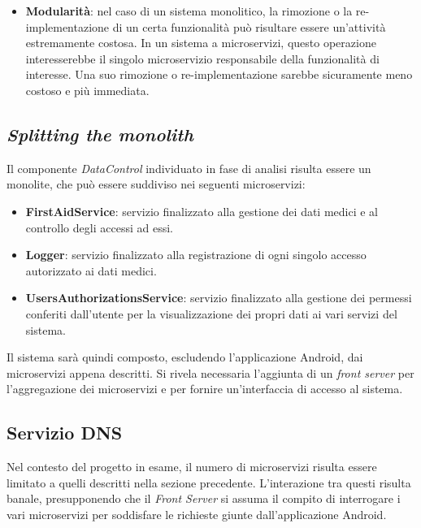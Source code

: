 \documentclass[a4paper,12pt]{report}
\begin{document}
\begin{itemize}
	\item \textbf{Modularità}: nel caso di un sistema monolitico, la rimozione o la re-implementazione di un certa funzionalità può risultare essere un'attività estremamente costosa. In un sistema a microservizi, questo operazione interesserebbe il singolo microservizio responsabile della funzionalità di interesse. Una suo rimozione o re-implementazione sarebbe sicuramente meno costoso e più immediata.
\end{itemize}


\subsection{\emph{Splitting the monolith}} \label{splitting}

Il componente \emph{DataControl} individuato in fase di analisi risulta essere un monolite, che può essere suddiviso nei seguenti microservizi:

\begin{itemize}
	\item \textbf{FirstAidService}: servizio finalizzato alla gestione dei dati medici e al controllo degli accessi ad essi. 
	\item \textbf{Logger}: servizio finalizzato alla registrazione di ogni singolo accesso autorizzato ai dati medici.
	\item \textbf{UsersAuthorizationsService}: servizio finalizzato alla gestione dei permessi conferiti dall'utente per la visualizzazione dei propri dati ai vari servizi del sistema. 
\end{itemize}

Il sistema sarà quindi composto, escludendo l'applicazione Android, dai microservizi appena descritti. Si rivela necessaria l'aggiunta di un \emph{front server} per l'aggregazione dei microservizi e per fornire un'interfaccia di accesso al sistema.

\subsection{Servizio DNS}

Nel contesto del progetto in esame, il numero di microservizi risulta essere limitato a quelli descritti nella sezione precedente. L'interazione tra questi risulta banale, presupponendo che il \emph{Front Server} si assuma il compito di interrogare i vari microservizi per soddisfare le richieste giunte dall'applicazione Android.
\end{document}
